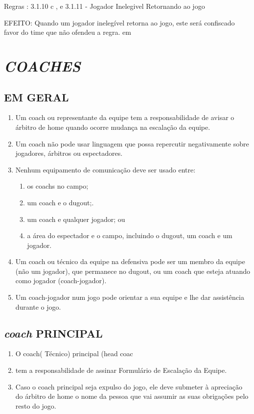  Regras : 3.1.10 c , e 3.1.11 - Jogador Inelegivel Retornando ao jogo

EFEITO:
 Quando um jogador inelegível retorna ao jogo, este será confiscado favor do time que não ofendeu a regra.
 em
\section{\textit{COACHES}}
\subsection{EM GERAL}
\begin{enumerate}[label=(\alph*)]
	\item Um \gls{coach} ou representante da equipe tem a responsabilidade de avisar o árbitro de \gls{home} quando ocorre mudança na escalação da equipe.
	\item Um \gls{coach} não pode usar linguagem que possa repercutir negativamente sobre jogadores, árbitros ou espectadores.
	\item Nenhum equipamento de comunicação deve ser usado entre:
	 \begin{enumerate}[label=\roman*.]
		\item os \glspl{coach} no campo;
		\item um \gls{coach} e o \gls{dugout};.
		\item um \gls{coach} e qualquer jogador; ou
		\item a área do espectador e o campo, incluindo o \gls{dugout}, um \gls{coach} e um jogador.
	\end{enumerate}
	\item Um \gls{coach} ou técnico da equipe na defensiva pode ser um membro da equipe (não um jogador), que permanece no \gls{dugout}, ou um \gls{coach} que esteja atuando como jogador (\gls{coach}-jogador).
	\item Um \gls{coach}-jogador num jogo pode orientar a sua equipe e lhe dar assistência durante o jogo.
\end{enumerate}

\subsection{\textit{coach} PRINCIPAL}

\begin{enumerate}[label=(\alph*)]
	\item O \gls{coach}( Técnico) principal (head coac\item  tem a responsabilidade de assinar Formulário de Escalação da Equipe.
	\item Caso o \gls{coach} principal seja expulso do jogo, ele deve submeter à apreciação do árbitro de \gls{home} o nome da pessoa que vai assumir as suas obrigações pelo resto do jogo.
\end{enumerate}

